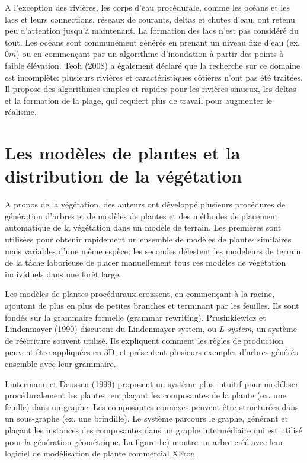 \documentclass[11pt]{report}
\begin{document}
 A l'exception des rivières, les corps d'eau procédurale, comme les océans et les lacs et leurs connections, réseaux de courants, deltas et chutes d'eau, ont retenu peu d'attention jusqu'à maintenant. La formation des lacs n'est pas considéré du tout. Les océans sont communément générés en  prenant un niveau fixe d'eau (ex. $0m$) ou en commençant par un algorithme d'inondation à partir des points à faible élévation. Teoh (2008) a également déclaré que la recherche sur ce domaine est incomplète: plusieurs rivières et caractéristiques côtières n'ont pas été traitées. Il propose des algorithmes simples et rapides pour les rivières sinueux, les deltas et la formation de la plage, qui requiert plus de travail pour augmenter le réalisme.
 
\section{Les modèles de plantes et la distribution de la végétation}

A propos de la végétation, des auteurs ont développé plusieurs procédures de génération d'arbres et de modèles de plantes et des méthodes de placement automatique de la végétation dans un modèle de terrain. Les premières sont utilisées pour obtenir rapidement un ensemble de modèles de plantes similaires mais variables d'une même espèce; les secondes délestent les modeleurs de terrain de la tâche laborieuse de placer manuellement tous ces modèles de végétation individuels dans une forêt large. \newline

Les modèles de plantes procéduraux croissent, en commençant à la racine, ajoutant de plus en plus de petites branches et terminant par les feuilles. Ils sont fondés sur la grammaire formelle (grammar rewriting). Prusinkiewicz et Lindenmayer (1990) discutent du Lindenmayer-system, ou \textit{L-system}, un système de réécriture souvent utilisé. Ils expliquent comment les règles de production peuvent être appliquées en 3D, et présentent plusieurs exemples d'arbres générés ensemble avec leur grammaire. \newline

Lintermann et Deussen (1999) proposent un système plus intuitif  pour modéliser procéduralement les plantes, en plaçant les composantes de la plante (ex. une feuille) dans un graphe. Les composantes connexes peuvent être structurées dans un sous-graphe (ex. une brindille). Le système parcours le graphe, générant et plaçant les instances des composantes dans un graphe intermédiaire qui est utilisé pour la génération géométrique. La figure 1e) montre un arbre créé avec leur logiciel de modélisation de plante commercial XFrog.\newline
\end{document}
